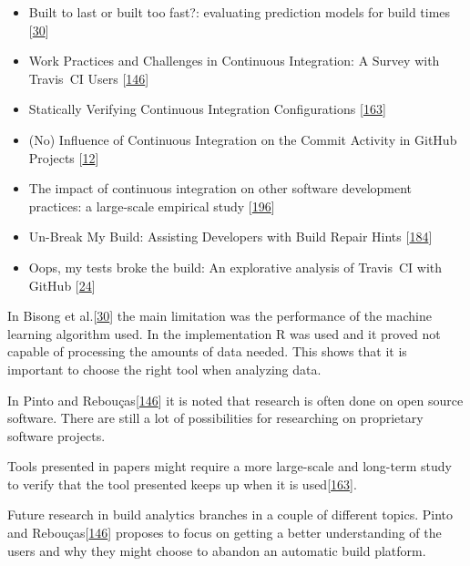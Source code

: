 \documentclass[]{book}
\providecommand{\tightlist}{%
  \setlength{\itemsep}{0pt}\setlength{\parskip}{0pt}}
\begin{document}
\begin{itemize}
\tightlist
\item
  Built to last or built too fast?: evaluating prediction models for
  build times {[}\protect\hyperlink{ref-bisong2017built}{30}{]}
\item
  Work Practices and Challenges in Continuous Integration: A Survey with
  Travis~CI Users {[}\protect\hyperlink{ref-pinto2018work}{146}{]}
\item
  Statically Verifying Continuous Integration Configurations
  {[}\protect\hyperlink{ref-santolucito2018statically}{163}{]}
\item
  (No) Influence of Continuous Integration on the Commit Activity in
  GitHub Projects {[}\protect\hyperlink{ref-baltes2018no}{12}{]}
\item
  The impact of continuous integration on other software development
  practices: a large-scale empirical study
  {[}\protect\hyperlink{ref-zhao2017impact}{196}{]}
\item
  Un-Break My Build: Assisting Developers with Build Repair Hints
  {[}\protect\hyperlink{ref-vassallo2018break}{184}{]}
\item
  Oops, my tests broke the build: An explorative analysis of Travis~CI
  with GitHub {[}\protect\hyperlink{ref-beller2017oops}{24}{]}
\end{itemize}

In Bisong et al.{[}\protect\hyperlink{ref-bisong2017built}{30}{]} the
main limitation was the performance of the machine learning algorithm
used. In the implementation R was used and it proved not capable of
processing the amounts of data needed. This shows that it is important
to choose the right tool when analyzing data.

In Pinto and Rebouças{[}\protect\hyperlink{ref-pinto2018work}{146}{]} it
is noted that research is often done on open source software. There are
still a lot of possibilities for researching on proprietary software
projects.

Tools presented in papers might require a more large-scale and long-term
study to verify that the tool presented keeps up when it is
used{[}\protect\hyperlink{ref-santolucito2018statically}{163}{]}.

Future research in build analytics branches in a couple of different
topics. Pinto and
Rebouças{[}\protect\hyperlink{ref-pinto2018work}{146}{]} proposes to
focus on getting a better understanding of the users and why they might
choose to abandon an automatic build platform.
\end{document}
